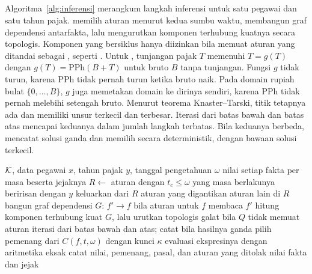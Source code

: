 
\subsection{}
\label{subsec:engine}

Algoritma~\ref{alg:inferensi} merangkum langkah inferensi untuk satu pegawai dan satu tahun pajak.  memilih aturan menurut kedua sumbu waktu, membangun graf dependensi antarfakta, lalu mengurutkan komponen terhubung kuatnya secara topologis. Komponen yang bersiklus hanya diizinkan bila memuat aturan yang ditandai sebagai , seperti . Untuk , tunjangan pajak $T$ memenuhi $T = g(T)$ dengan $g(T) = \mathrm{PPh}(B + T)$ untuk bruto $B$ tanpa tunjangan. Fungsi $g$ tidak turun, karena PPh tidak pernah turun ketika bruto naik. Pada domain rupiah bulat $\{0, \dots, B\}$, $g$ juga memetakan domain ke dirinya sendiri, karena PPh tidak pernah melebihi setengah bruto. Menurut teorema Knaster--Tarski, titik tetapnya ada dan memiliki unsur terkecil dan terbesar. Iterasi dari batas bawah dan batas atas mencapai keduanya dalam jumlah langkah terbatas. Bila keduanya berbeda,  mencatat solusi ganda dan memilih secara deterministik, dengan bawaan solusi terkecil.

\begin{algorithm}[t]
\caption{Inferensi untuk satu pegawai dan satu tahun pajak}
\label{alg:inferensi}
\footnotesize
\begin{algorithmic}[1]
\Require $\mathcal{K}$, data pegawai $x$, tahun pajak $y$, tanggal pengetahuan $\omega$
\Ensure nilai setiap fakta per masa beserta jejaknya
\State $R \gets$ aturan dengan $t_c \le \omega$ yang masa berlakunya beririsan dengan $y$
\State keluarkan dari $R$ aturan yang digantikan aturan lain di $R$
\State bangun graf dependensi $G$: $f' \to f$ bila aturan untuk $f$ membaca $f'$
\State hitung komponen terhubung kuat $G$, lalu urutkan topologis
    \State galat bila $Q$ tidak memuat aturan 
    \State iterasi dari batas bawah dan atas; catat bila hasilnya ganda
  \Else
      \State pilih pemenang dari $C(f, t, \omega)$ dengan kunci $\kappa$
      \State evaluasi ekspresinya dengan aritmetika eksak
      \State catat nilai, pemenang, pasal, dan aturan yang ditolak
    \EndFor
  \EndIf
\EndFor
\State \Return nilai fakta dan jejak
\end{algorithmic}
\end{algorithm}

